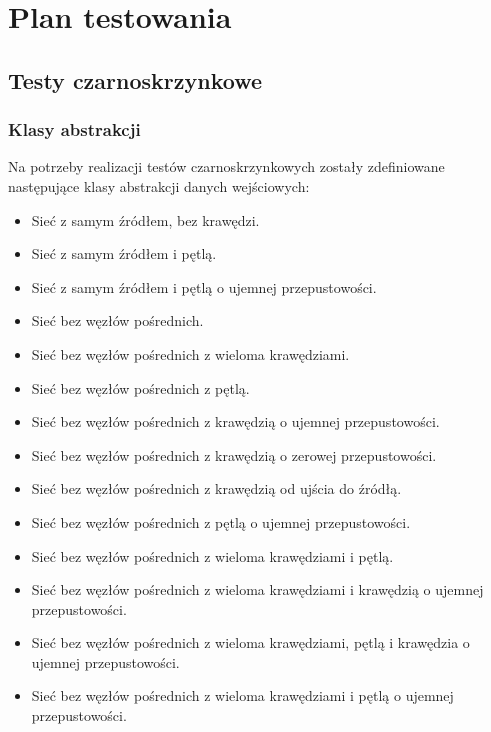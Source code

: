 \documentclass[10pt]{dokument-tiwo}
\begin{document}
\MakeDokumentMeta


\section{Plan testowania}
  \subsection{Testy czarnoskrzynkowe}
    \subsubsection{Klasy abstrakcji}
    Na potrzeby realizacji testów czarnoskrzynkowych zostały zdefiniowane\\następujące klasy abstrakcji danych wejściowych:
    \begin{itemize}
    \item Sieć z samym źródłem, bez krawędzi.
    \item Sieć z samym źródłem i pętlą.
    \item Sieć z samym źródłem i pętlą o ujemnej przepustowości.


    \item Sieć bez węzłów pośrednich.
    \item Sieć bez węzłów pośrednich z wieloma krawędziami.
    \item Sieć bez węzłów pośrednich z pętlą.
    \item Sieć bez węzłów pośrednich z krawędzią o ujemnej przepustowości.
    \item Sieć bez węzłów pośrednich z krawędzią o zerowej przepustowości.
    \item Sieć bez węzłów pośrednich z krawędzią od ujścia do źródłą.
    \item Sieć bez węzłów pośrednich z pętlą o ujemnej przepustowości.
    \item Sieć bez węzłów pośrednich z wieloma krawędziami i pętlą.
    \item Sieć bez węzłów pośrednich z wieloma krawędziami i krawędzią o ujemnej przepustowości.
    \item Sieć bez węzłów pośrednich z wieloma krawędziami, pętlą i krawędzia o ujemnej przepustowości.
    \item Sieć bez węzłów pośrednich z wieloma krawędziami i pętlą o ujemnej przepustowości.
    \end{itemize}
\end{document}
